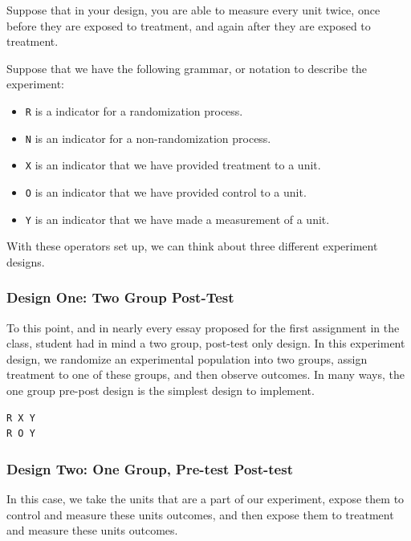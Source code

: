 \documentclass[
]{article}
\providecommand{\tightlist}{%
  \setlength{\itemsep}{0pt}\setlength{\parskip}{0pt}}
\begin{document}
Suppose that in your design, you are able to measure every unit twice, once before they are exposed to treatment, and again after they are exposed to treatment.

Suppose that we have the following grammar, or notation to describe the experiment:

\begin{itemize}
\tightlist
\item
  \texttt{R} is a indicator for a randomization process.
\item
  \texttt{N} is an indicator for a non-randomization process.
\item
  \texttt{X} is an indicator that we have provided treatment to a unit.
\item
  \texttt{O} is an indicator that we have provided control to a unit.
\item
  \texttt{Y} is an indicator that we have made a measurement of a unit.
\end{itemize}

With these operators set up, we can think about three different experiment designs.

\hypertarget{design-one-two-group-post-test}{%
\subsubsection{Design One: Two Group Post-Test}\label{design-one-two-group-post-test}}

To this point, and in nearly every essay proposed for the first assignment in the class, student had in mind a two group, post-test only design. In this experiment design, we randomize an experimental population into two groups, assign treatment to one of these groups, and then observe outcomes. In many ways, the one group pre-post design is the simplest design to implement.

\begin{verbatim}
R X Y 
R O Y
\end{verbatim}

\hypertarget{design-two-one-group-pre-test-post-test}{%
\subsubsection{Design Two: One Group, Pre-test Post-test}\label{design-two-one-group-pre-test-post-test}}

In this case, we take the units that are a part of our experiment, expose them to control and measure these units outcomes, and then expose them to treatment and measure these units outcomes.
\end{document}
